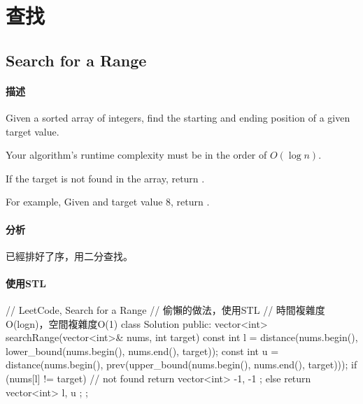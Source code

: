 \chapter{查找}


\section{Search for a Range} %
\label{sec:search-for-a-range}


\subsubsection{描述}
Given a sorted array of integers, find the starting and ending position of a given target value.

Your algorithm's runtime complexity must be in the order of $O(\log n)$.

If the target is not found in the array, return \code{\[-1, -1\]}.

For example,
Given \code{\[5, 7, 7, 8, 8, 10\]} and target value 8,
return \code{\[3, 4\]}.


\subsubsection{分析}
已經排好了序，用二分查找。


\subsubsection{使用STL}
\begin{Code}
// LeetCode, Search for a Range
// 偷懶的做法，使用STL
// 時間複雜度O(logn)，空間複雜度O(1)
class Solution {
public:
    vector<int> searchRange(vector<int>& nums, int target) {
        const int l = distance(nums.begin(), lower_bound(nums.begin(), nums.end(), target));
        const int u =
              distance(nums.begin(), prev(upper_bound(nums.begin(), nums.end(), target)));
        if (nums[l] != target) // not found
            return vector<int> { -1, -1 };
        else
            return vector<int> { l, u };
    }
};
\end{Code}



